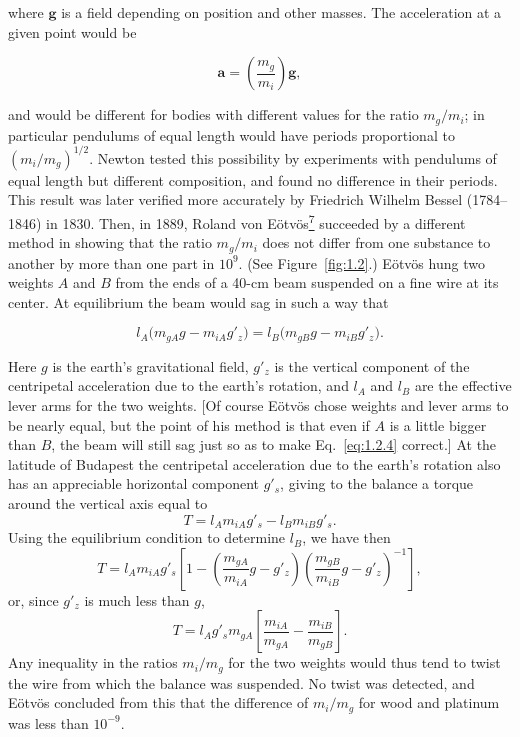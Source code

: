 where \(\mathbf g\) is a field depending on position and other masses. The
acceleration at a given point would be

\begin{equation}
  \mathbf a=\left(\frac{m_g}{m_i}\right)\mathbf g,
  \tag{1.2.3}\label{eq:1.2.3}
\end{equation}

and would be different for bodies with different values for the ratio
\(m_g/m_i\); in particular pendulums of equal length would have periods
proportional to \((m_i/m_g)^{1/2}\). Newton tested this possibility by
experiments with pendulums of equal length but different composition, and
found no difference in their periods. This result was later verified more
accurately by Friedrich Wilhelm Bessel (1784--1846) in 1830. Then, in 1889,
Roland von E\"otv\"os\hyperref[ch1-ref-7]{\textsuperscript{7}} succeeded by a
different method in showing that the ratio \(m_g/m_i\) does not differ from
one substance to another by more than one part in \(10^9\). (See
Figure~\ref{fig:1.2}.) E\"otv\"os hung two weights \(A\) and \(B\) from the
ends of a 40-cm beam suspended on a fine wire at its center. At equilibrium
the beam would sag in such a way that

\begin{equation}
  l_A\bigl(m_{gA}g-m_{iA}g'_z\bigr)
  =
  l_B\bigl(m_{gB}g-m_{iB}g'_z\bigr).
  \tag{1.2.4}\label{eq:1.2.4}
\end{equation}



Here \(g\) is the earth's gravitational field, \(g'_z\) is the vertical
component of the centripetal acceleration due to the earth's rotation, and
\(l_A\) and \(l_B\) are the effective lever arms for the two weights. [Of
course E\"otv\"os chose weights and lever arms to be nearly equal, but the
point of his method is that even if \(A\) is a little bigger than \(B\), the
beam will still sag just so as to make Eq.~\eqref{eq:1.2.4} correct.] At the
latitude of Budapest the centripetal acceleration due to the earth's rotation
also has an appreciable horizontal component \(g'_s\), giving to the balance a
torque around the vertical axis equal to
\[
  T=l_A m_{iA}g'_s-l_Bm_{iB}g'_s.
\]
Using the equilibrium condition to determine \(l_B\), we have then
\[
  T=l_A m_{iA}g'_s\left[
    1-\left(\frac{m_{gA}}{m_{iA}}g-g'_z\right)
       \left(\frac{m_{gB}}{m_{iB}}g-g'_z\right)^{-1}
  \right],
\]
or, since \(g'_z\) is much less than \(g\),
\[
  T=l_Ag'_s m_{gA}
  \left[\frac{m_{iA}}{m_{gA}}-\frac{m_{iB}}{m_{gB}}\right].
\]
Any inequality in the ratios \(m_i/m_g\) for the two weights would thus tend
to twist the wire from which the balance was suspended. No twist was detected,
and E\"otv\"os concluded from this that the difference of \(m_i/m_g\) for
wood and platinum was less than \(10^{-9}\).

